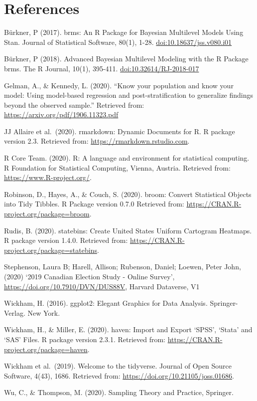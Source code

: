 \documentclass[
  12pt,
]{article}
\begin{document}
\pagebreak

\hypertarget{references}{%
\section{References}\label{references}}

Bürkner, P (2017). brms: An R Package for Bayesian Multilevel Models
Using Stan. Journal of Statistical Software, 80(1), 1-28.
\url{doi:10.18637/jss.v080.i01}

Bürkner, P (2018). Advanced Bayesian Multilevel Modeling with the R
Package brms. The R Journal, 10(1), 395-411.
\url{doi:10.32614/RJ-2018-017}

Gelman, A., \& Kennedy, L. (2020). ``Know your population and know your
model: Using model-based regression and post-stratification to
generalize findings beyond the observed sample.'' Retrieved from:
\url{https://arxiv.org/pdf/1906.11323.pdf}

JJ Allaire et al.~(2020). rmarkdown: Dynamic Documents for R. R package
version 2.3. Retrieved from: \url{https://rmarkdown.rstudio.com}.

R Core Team. (2020). R: A language and environment for statistical
computing. R Foundation for Statistical Computing, Vienna, Austria.
Retrieved from: \url{https://www.R-project.org/}.

Robinson, D., Hayes, A., \& Couch, S. (2020). broom: Convert Statistical
Objects into Tidy Tibbles. R Package version 0.7.0 Retrieved from:
\url{https://CRAN.R-project.org/package=broom}.

Rudis, B. (2020). statebins: Create United States Uniform Cartogram
Heatmaps. R package version 1.4.0. Retrieved from:
\url{https://CRAN.R-project.org/package=statebins}.

Stephenson, Laura B; Harell, Allison; Rubenson, Daniel; Loewen, Peter
John, (2020) `2019 Canadian Election Study - Online Survey',
\url{https://doi.org/10.7910/DVN/DUS88V}, Harvard Dataverse, V1

Wickham, H. (2016). ggplot2: Elegant Graphics for Data Analysis.
Springer-Verlag. New York.

Wickham, H., \& Miller, E. (2020). haven: Import and Export `SPSS',
`Stata' and `SAS' Files. R package version 2.3.1. Retrieved from:
\url{https://CRAN.R-project.org/package=haven}.

Wickham et al.~(2019). Welcome to the tidyverse. Journal of Open Source
Software, 4(43), 1686. Retrieved from:
\url{https://doi.org/10.21105/joss.01686}.

Wu, C., \& Thompson, M. (2020). Sampling Theory and Practice, Springer.
\end{document}
